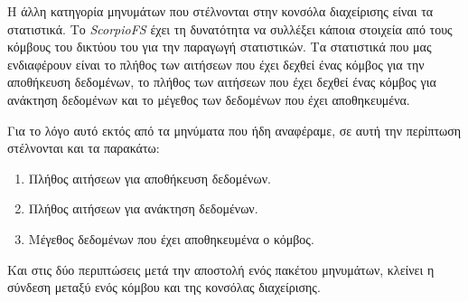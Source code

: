 \documentclass[a4paper]{article}
\begin{document}
Η άλλη κατηγορία μηνυμάτων που στέλνονται στην κονσόλα διαχείρισης είναι τα
στατιστικά. Το \emph{ScorpioFS} έχει τη δυνατότητα να συλλέξει κάποια στοιχεία από
τους κόμβους του δικτύου του για την παραγωγή στατιστικών. Τα στατιστικά που μας
ενδιαφέρουν είναι το πλήθος των αιτήσεων που έχει δεχθεί ένας κόμβος για την
αποθήκευση δεδομένων, το πλήθος των αιτήσεων που έχει δεχθεί ένας
κόμβος για ανάκτηση δεδομένων και το μέγεθος των δεδομένων που έχει
αποθηκευμένα.

Για το λόγο αυτό εκτός από τα μηνύματα που ήδη αναφέραμε, σε αυτή την
περίπτωση στέλνονται και τα παρακάτω:
\begin{enumerate}
\item Πλήθος αιτήσεων για αποθήκευση δεδομένων.
\item Πλήθος αιτήσεων για ανάκτηση δεδομένων.
\item Μέγεθος δεδομένων που έχει αποθηκευμένα ο κόμβος.
\end{enumerate}

Και στις δύο περιπτώσεις μετά την αποστολή ενός πακέτου μηνυμάτων, κλείνει η
σύνδεση μεταξύ ενός κόμβου και της κονσόλας διαχείρισης.
\end{document}
